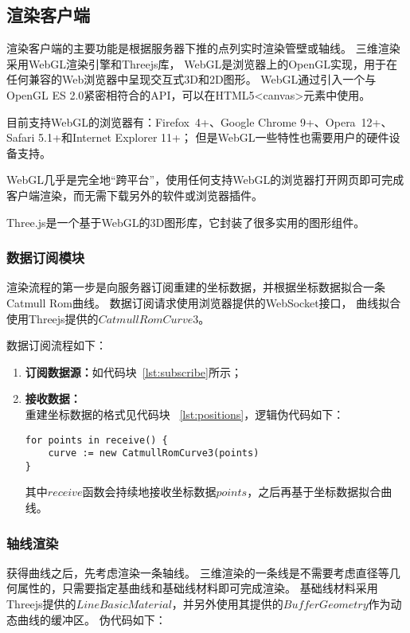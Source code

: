 \subsection{渲染客户端}

渲染客户端的主要功能是根据服务器下推的点列实时渲染管壁或轴线。
三维渲染采用WebGL渲染引擎和Threejs库，
WebGL是浏览器上的OpenGL实现，用于在任何兼容的Web浏览器中呈现交互式3D和2D图形\cite{webgl}。
WebGL通过引入一个与OpenGL ES 2.0紧密相符合的API，可以在HTML5<canvas>元素中使用。

目前支持WebGL的浏览器有：Firefox 4+、Google Chrome 9+、Opera 12+、Safari 5.1+和Internet Explorer 11+；
但是WebGL一些特性也需要用户的硬件设备支持。

WebGL几乎是完全地“跨平台”，使用任何支持WebGL的浏览器打开网页即可完成客户端渲染，而无需下载另外的软件或浏览器插件。

Three.js是一个基于WebGL的3D图形库\cite{threejs}，它封装了很多实用的图形组件。

\subsubsection{数据订阅模块}
渲染流程的第一步是向服务器订阅重建的坐标数据，并根据坐标数据拟合一条Catmull Rom曲线。
数据订阅请求使用浏览器提供的WebSocket接口\cite{mdn-websocket}，
曲线拟合使用Threejs提供的$CatmullRomCurve3$。

数据订阅流程如下：

\begin{enumerate}
\item \textbf{订阅数据源：}如代码块~\ref{lst:subscribe}所示；
\item \textbf{接收数据：} \\
重建坐标数据的格式见代码块 ~\ref{lst:positions}，逻辑伪代码如下：

\begin{lstlisting}[caption={订阅数据}]
for points in receive() {
    curve := new CatmullRomCurve3(points)
}
\end{lstlisting}

其中$receive$函数会持续地接收坐标数据$points$，之后再基于坐标数据拟合曲线。

\end{enumerate}

\subsubsection{轴线渲染}

获得曲线之后，先考虑渲染一条轴线。
三维渲染的一条线是不需要考虑直径等几何属性的，只需要指定基曲线和基础线材料即可完成渲染。
基础线材料采用Threejs提供的$LineBasicMaterial$，并另外使用其提供的$BufferGeometry$作为动态曲线的缓冲区。
伪代码如下：

